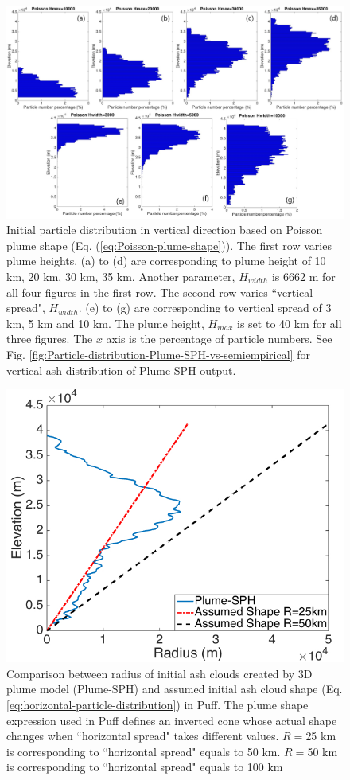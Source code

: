 \documentclass[utf8]{frontiersSCNS} %
\begin{document}
\begin{figure}[!htb]
\centering
\includegraphics[width=1.0\textwidth]{Figures/particle_distribution_vertical_calibration}
\caption{Initial particle distribution in vertical direction based on Poisson plume shape  (Eq. (\ref{eq:Poisson-plume-shape})). The first row varies plume heights. (a) to (d) are corresponding to plume height of 10 km, 20 km, 30 km, 35 km. Another parameter, $H_{width}$ is 6662 m for all four figures in the first row. The second row varies ``vertical spread", $H_{width}$. (e) to (g) are corresponding to vertical spread of 3 km, 5 km and 10 km. The plume height, $H_{max}$ is set to 40 km for all three figures. The $x$ axis is the percentage of particle numbers. See Fig. \ref{fig:Particle-distribution-Plume-SPH-vs-semiempirical} for vertical ash distribution of Plume-SPH output.}
\label{fig:Particle-distribution-Plume-calibrate-semiempirical}
\end{figure}

\begin{figure}[!htb]
\centering
\includegraphics[width=0.50 \textwidth]{Figures/radius-Plume-SPH-And-Assumed}
\caption{Comparison between radius of initial ash clouds created by 3D plume model (Plume-SPH) and assumed initial ash cloud shape (Eq. \ref{eq:horizontal-particle-distribution}) in Puff. The plume shape expression used in Puff defines an inverted cone whose actual shape changes when ``horizontal spread" takes different values. $R=$25 km is corresponding to ``horizontal spread" equals to 50 km. $R=$50 km is corresponding to ``horizontal spread" equals to 100 km}
\label{fig:radius-comparison}
\end{figure}
\end{document}
